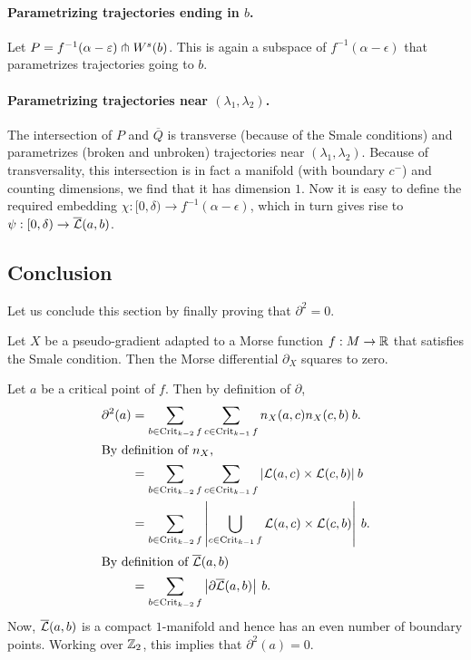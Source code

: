 \begin{myproof}
    \paragraph{Parametrizing trajectories ending in $b$.}
    Let $P = f^{-1}(\alpha - \varepsilon) \pitchfork W^s(b)$.
    This is again a subspace of $f^{-1}(\alpha-\epsilon)$ that parametrizes trajectories going to $b$.

    \paragraph{Parametrizing trajectories near $(\lambda_1, \lambda_2)$.}
    The intersection of $P$ and  $\overline{Q}$ is transverse (because of the Smale conditions) and parametrizes (broken and unbroken) trajectories near $(\lambda_1, \lambda_2)$.
    Because of transversality, this intersection is in fact a manifold (with boundary $c^{-}$) and counting dimensions, we find that it has dimension $1$.
    Now it is easy to define the required embedding $\chi: [0, \delta) \to  f^{-1}(\alpha-\epsilon)$, which in turn gives rise to $\psi: [0, \delta) \to  \overline{\mathcal L}(a, b)$.

\end{myproof}
\subsection{Conclusion}

Let us conclude this section by finally proving that $\partial^2 = 0$.
\begin{theorem}
    Let $X$ be a pseudo-gradient adapted to a Morse function  $f: M \to  \mathbb{R}$ that satisfies the Smale condition.
    Then the Morse differential $\partial_X$ squares to zero.
\end{theorem}
\begin{myproof}
    Let $a$ be a critical point of $f$.
    Then by definition of $\partial$,
    \begin{align*}
        \partial^2(a)
        &= 
        \sum_{b \in  \operatorname{Crit}_{k-2}f}
        \sum_{c \in  \operatorname{Crit}_{k-1}f}
        n_X(a, c) n_X(c, b) \: b.\\
        \shortintertext{By definition of $n_X$,}
        &= 
        \sum_{b \in  \operatorname{Crit}_{k-2}f}
        \sum_{c \in  \operatorname{Crit}_{k-1}f}
        |\mathcal L(a, c) \times \mathcal L(c, b) |\:  b\\
        &= 
        \sum_{b \in  \operatorname{Crit}_{k-2}f}
        \left| \bigcup_{c \in  \operatorname{Crit}_{k-1}f}
        \mathcal L(a, c) \times \mathcal L(c, b) \right|\:  b.\\
        \shortintertext{By definition of $\overline{\mathcal L}(a, b)$}
        &= \sum_{b \in  \operatorname{Crit}_{k-2}f} \left|\partial \overline{\mathcal L}(a, b) \right|\:  b.
    \end{align*} 
    Now, $\overline{\mathcal L}(a, b)$ is a compact  $1$-manifold and hence has an even number of boundary points. Working over $ \mathbb{Z}_2$, this implies that $\partial^2(a) = 0$.
\end{myproof}

